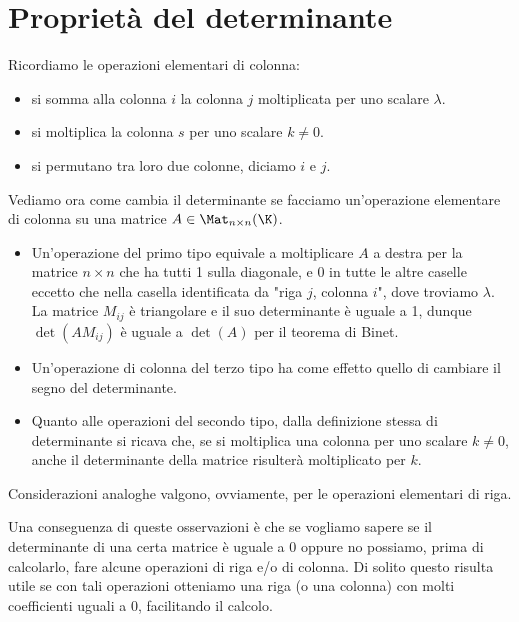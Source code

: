 \section{Proprietà del determinante}

Ricordiamo le operazioni elementari di colonna:
\begin{itemize}
	\item si somma alla colonna $i$ la colonna $j$ moltiplicata per uno
	      scalare $\lambda$.
	\item si moltiplica la colonna $s$ per uno scalare $k \neq 0$.
	\item si permutano tra loro due colonne, diciamo $i$ e $j$.
\end{itemize}

Vediamo ora come cambia il determinante se facciamo un'operazione elementare di colonna
su una matrice $A \in \Mat_{n \times n}(\K)$.
\begin{itemize}
	\item Un'operazione del primo tipo equivale a moltiplicare $A$ a destra per la
	      matrice $n \times n$ che ha tutti 1 sulla diagonale, e 0 in tutte le altre
	      caselle eccetto che nella casella identificata da "riga $j$, colonna $i$",
	      dove troviamo $\lambda$. La matrice $M_{ij}$ è triangolare e il suo
	      determinante è uguale a 1, dunque $\det(AM_{ij})$ è uguale a $\det(A)$ per
	      il teorema di Binet.
	\item Un'operazione di colonna del terzo tipo ha come
	      effetto quello di cambiare il segno del determinante.
	\item Quanto alle operazioni del secondo tipo, dalla definizione stessa di
	      determinante si ricava che, se si moltiplica una colonna per uno scalare
	      $k \neq 0$, anche il determinante della matrice risulterà moltiplicato
	      per $k$.
\end{itemize}
Considerazioni analoghe valgono, ovviamente, per le operazioni elementari di riga.

Una conseguenza di queste osservazioni è che se vogliamo sapere se il
determinante di una certa matrice è uguale a 0 oppure no possiamo,
prima di calcolarlo, fare alcune operazioni di riga e/o di colonna.
Di solito questo risulta utile se con tali operazioni otteniamo una riga
(o una colonna) con molti coefficienti uguali a 0, facilitando il calcolo.
